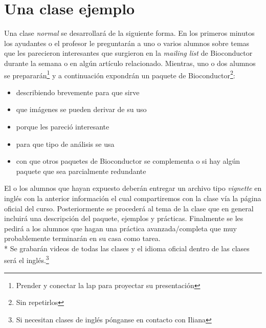 \documentclass[letterpaper,12pt]{article}
\begin{document}
\section{Una clase ejemplo}
Una clase \emph{normal} se desarrollará de la siguiente forma. En los primeros minutos los ayudantes o el profesor le preguntarán a uno o varios alumnos sobre temas que les parecieron interesantes que surgieron en la \emph{mailing list} de Bioconductor durante la semana o en algún artículo relacionado. Mientras, uno o dos alumnos se prepararán\footnote{Prender y conectar la lap para proyectar su presentación} y a continuación expondrán un paquete de Bioconductor\footnote{Sin repetirlos}:
  \begin{itemize}
  \item describiendo brevemente para que sirve
  \item que imágenes se pueden derivar de su uso
  \item porque les pareció interesante
  \item para que tipo de análisis se usa
  \item con que otros paquetes de Bioconductor se complementa o si hay algún paquete que sea parcialmente redundante
  \end{itemize}
El o los alumnos que hayan expuesto deberán entregar un archivo tipo \emph{vignette} en inglés con la anterior información el cual compartiremos con la clase vía la página oficial del curso. Posteriormente se procederá al tema de la clase que en general incluirá una descripción del paquete, ejemplos y prácticas. Finalmente se les pedirá a los alumnos que hagan una práctica avanzada/completa que muy probablemente terminarán en su casa como tarea.
\\* \indent Se grabarán videos de todas las clases y el idioma oficial dentro de las clases será el inglés.\footnote{Si necesitan clases de inglés pónganse en contacto con Iliana}
\end{document}
